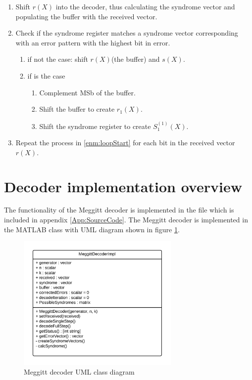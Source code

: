 \documentclass[Main]{subfiles}
\begin{document}
\begin{enumerate}
\item Shift $r(X)$ into the decoder, thus calculating the syndrome vector and populating the buffer with the received vector.
\item \label{enm:loopStart} Check if the syndrome register matches a syndrome vector corresponding with an error pattern with the highest bit in error.
\begin{enumerate}
\item if not the case: shift $r(X)$(the buffer) and $s(X)$.
\item if is the case
\begin{enumerate}
\item Complement MSb of the buffer.
\item Shift the buffer to create $r_1(X)$.
\item Shift the syndrome register to create $S_1^{(1)}(X)$.
\end{enumerate}
\end{enumerate}
\item Repeat the process in \ref{enm:loopStart} for each bit in the received vector $r(X)$.
\end{enumerate}

\section{Decoder implementation overview}\label{sec:decImplOv}

The functionality of the Meggitt decoder is implemented in the file  which is included in appendix \ref{App:SourceCode}. The Meggitt decoder is implemented in the MATLAB class  with UML diagram shown in figure \ref{fig:meggittUML}.

\begin{figure}[h]
    \centering
    \includegraphics[width=0.7\textwidth]{figures/MeggitDecoderUML}
    \caption{Meggitt decoder UML class diagram}
    \label{fig:meggittUML}
\end{figure}
\end{document}
